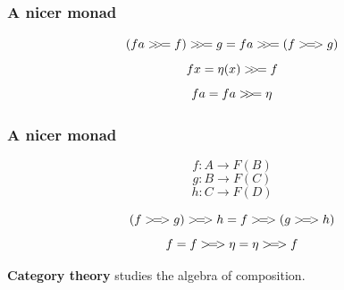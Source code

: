 \documentclass{beamer}
\begin{document}
\begin{frame}

  \frametitle{A nicer monad}
  \Large

  $$(fa \bind f) \bind g = fa \bind (f \kcomp g)$$
  $$f x = \eta(x) >\!\!>\!= f$$
  $$fa = fa >\!\!>\!= \eta$$

\end{frame}

\begin{frame}

  \frametitle{A nicer monad}
  \Large

  $$f: A \rightarrow F(B)$$
  $$g: B \rightarrow F(C)$$
  $$h: C \rightarrow F(D)$$ \pause

  $$(f \kcomp g) \kcomp h = f \kcomp (g \kcomp h)$$
  $$f = f >\!=\!> \eta = \eta >\!=\!> f$$

\end{frame}

\begin{frame}
  \centering
  \LARGE

  \textbf{Category theory}
  studies the algebra of composition.
\end{frame}
\end{document}

